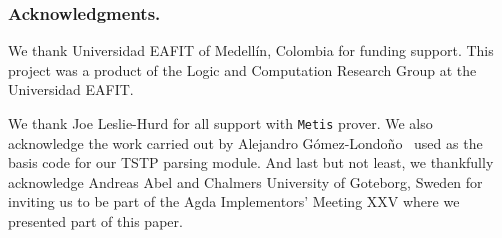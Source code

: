 \documentclass[main.tex]{subfiles}
\begin{document}

\subsubsection*{Acknowledgments.}

We thank Universidad EAFIT of Medell\'in, Colombia for funding support.
This project was a product of the Logic and Computation Research
Group at the Universidad EAFIT.

We thank Joe Leslie-Hurd for all support with \verb!Metis! prover.
We also acknowledge the work carried out by Alejandro G\'omez-Londo\~no~
\cite{Gomez-Londono2015} used as the basis code for our TSTP parsing
module.
And last but not least, we thankfully acknowledge Andreas Abel and Chalmers
University of Goteborg, Sweden for inviting us to be part of the Agda
Implementors’ Meeting XXV where we presented part of this paper.
\end{document}
